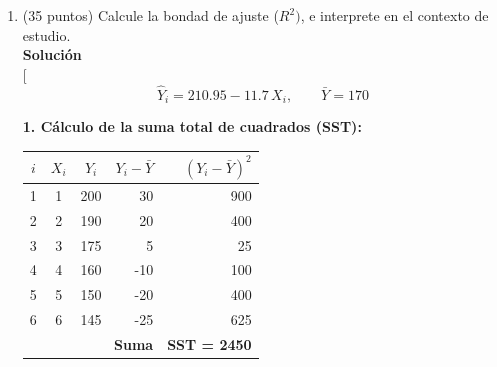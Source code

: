 \documentclass[10pt,a4paper]{article}
\begin{document}
\begin{enumerate}
\begin{enumerate}
\[
S_{xx}=\sum (X_i-\bar X)^2=17.5,\qquad
S_{xy}=\sum (X_i-\bar X)(Y_i-\bar Y)=-205.
\]

\[
\widehat{\beta}_1=\frac{S_{xy}}{S_{xx}}=\frac{-205}{17.5}=-\frac{82}{7}\approx -11.7143,
\qquad
\widehat{\beta}_0=\bar Y-\widehat{\beta}_1\,\bar X
=170-\Big(-\frac{82}{7}\Big)\cdot 3.5=211.
\]

\textbf{Recta estimada (exacta):}\quad
\(\widehat{Y}=211-\frac{82}{7}X\;\approx\;211-11.7143\,X.\)

\textbf{Interpretación:} una hora adicional de actividad física se asocia con una \emph{reducción} de
aprox. \(11.7\) mg/dL en LDL; el intercepto \(211\) es el LDL esperado cuando \(X=0\).

\item (35 puntos) Calcule la bondad de ajuste ($R^2)$, e interprete en el contexto de estudio.
\\
\textbf{Solución}
\\[
\[
\widehat{Y}_i = 210.95 - 11.7\,X_i,
\qquad
\bar{Y} = 170
\]

\textbf{1. Cálculo de la suma total de cuadrados (SST):}
\begin{center}
\begin{tabular}{|c|c|c|r|r|}
\hline
$i$ & $X_i$ & $Y_i$ & $Y_i - \bar{Y}$ & $(Y_i - \bar{Y})^2$ \\
\hline
1 & 1 & 200 & \phantom{-}30 & 900 \\
2 & 2 & 190 & \phantom{-}20 & 400 \\
3 & 3 & 175 & \phantom{-}\,5 & 25 \\
4 & 4 & 160 & -10 & 100 \\
5 & 5 & 150 & -20 & 400 \\
6 & 6 & 145 & -25 & 625 \\
\hline
\multicolumn{4}{|r|}{\textbf{Suma}} & \textbf{SST = 2450} \\
\hline
\end{tabular}
\end{center}


\end{enumerate}
\end{enumerate}
\end{document}
